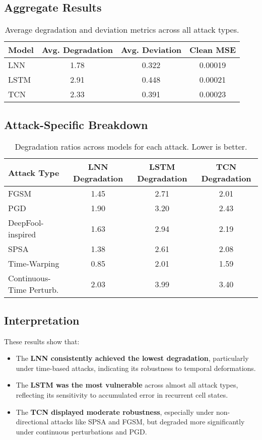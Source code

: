 \subsection{Aggregate Results}

\begin{table}[H]
\centering
\begin{tabular}{|l|c|c|c|}
\hline
\textbf{Model} & \textbf{Avg. Degradation} & \textbf{Avg. Deviation} & \textbf{Clean MSE} \\
\hline
LNN   & 1.78 & 0.322 & 0.00019 \\
LSTM  & 2.91 & 0.448 & 0.00021 \\
TCN   & 2.33 & 0.391 & 0.00023 \\
\hline
\end{tabular}
\caption{Average degradation and deviation metrics across all attack types.}
\label{tab:agg_metrics}
\end{table}

\subsection{Attack-Specific Breakdown}

\begin{table}[H]
\centering
\small
\begin{tabular}{|l|c|c|c|}
\hline
\textbf{Attack Type} & \textbf{LNN Degradation} & \textbf{LSTM Degradation} & \textbf{TCN Degradation} \\
\hline
FGSM                      & 1.45 & 2.71 & 2.01 \\
PGD                       & 1.90 & 3.20 & 2.43 \\
DeepFool-inspired         & 1.63 & 2.94 & 2.19 \\
SPSA                      & 1.38 & 2.61 & 2.08 \\
Time-Warping              & 0.85 & 2.01 & 1.59 \\
Continuous-Time Perturb.  & 2.03 & 3.99 & 3.40 \\
\hline
\end{tabular}
\caption{Degradation ratios across models for each attack. Lower is better.}
\label{tab:attack_results}
\end{table}

\subsection{Interpretation}

These results show that:
\begin{itemize}
    \item The \textbf{LNN consistently achieved the lowest degradation}, particularly under time-based attacks, indicating its robustness to temporal deformations.
    \item The \textbf{LSTM was the most vulnerable} across almost all attack types, reflecting its sensitivity to accumulated error in recurrent cell states.
    \item The \textbf{TCN displayed moderate robustness}, especially under non-directional attacks like SPSA and FGSM, but degraded more significantly under continuous perturbations and PGD.
\end{itemize}

